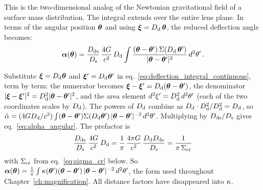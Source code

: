 This is the two-dimensional analog of the Newtonian gravitational field
of a surface mass distribution.  The integral extends over the entire
lens plane.  In terms of the angular position $\boldsymbol{\theta}$ and using
$\boldsymbol{\xi} = D_{\mathrm{d}}\,\boldsymbol{\theta}$, the reduced deflection angle becomes:
\begin{equation}
    \boldsymbol{\alpha}(\boldsymbol{\theta}) = \frac{D_{\mathrm{ds}}}{D_{\mathrm{s}}}\,
    \frac{4G}{c^2}\, D_{\mathrm{d}}
    \int \frac{(\boldsymbol{\theta} - \boldsymbol{\theta}')\, \Sigma(D_{\mathrm{d}}\,\boldsymbol{\theta}')}
    {|\boldsymbol{\theta} - \boldsymbol{\theta}'|^2}\, d^2\theta' \,.
    \label{eq:alpha_angular}
\end{equation}
\begin{derivation}
Substitute $\boldsymbol{\xi} = D_{\mathrm{d}}\boldsymbol{\theta}$ and $\boldsymbol{\xi}' = D_{\mathrm{d}}\boldsymbol{\theta}'$ in
eq.~\eqref{eq:deflection_integral_continuous}, term by term: the
numerator becomes $\boldsymbol{\xi} - \boldsymbol{\xi}' = D_{\mathrm{d}}(\boldsymbol{\theta} - \boldsymbol{\theta}')$, the
denominator $|\boldsymbol{\xi} - \boldsymbol{\xi}'|^2 = D_{\mathrm{d}}^2|\boldsymbol{\theta} - \boldsymbol{\theta}'|^2$, and
the area element $d^2\xi' = D_{\mathrm{d}}^2\, d^2\theta'$ (each of the two
coordinates scales by $D_{\mathrm{d}}$).
The powers of $D_{\mathrm{d}}$ combine as $D_{\mathrm{d}} \cdot D_{\mathrm{d}}^2 / D_{\mathrm{d}}^2 = D_{\mathrm{d}}$, so
$\hat{\alpha} = (4GD_{\mathrm{d}}/c^2)\int(\boldsymbol{\theta} - \boldsymbol{\theta}')
\Sigma(D_{\mathrm{d}}\boldsymbol{\theta}')\,|\boldsymbol{\theta} - \boldsymbol{\theta}'|^{-2}\,d^2\theta'$. Multiplying by
$D_{\mathrm{ds}}/D_{\mathrm{s}}$ gives eq.~\eqref{eq:alpha_angular}. The prefactor is
\begin{equation*}
    \frac{D_{\mathrm{ds}}}{D_{\mathrm{s}}}\,\frac{4G}{c^2}\,D_{\mathrm{d}}
    = \frac{1}{\pi}\,\frac{4\pi G}{c^2}\,\frac{D_{\mathrm{d}}D_{\mathrm{ds}}}{D_{\mathrm{s}}}
    = \frac{1}{\pi\,\Sigma_{\mathrm{cr}}}
\end{equation*}
with $\Sigma_{\mathrm{cr}}$ from eq.~\eqref{eq:sigma_cr} below. So
$\boldsymbol{\alpha}(\boldsymbol{\theta}) = \frac{1}{\pi}\int\kappa(\boldsymbol{\theta}')
(\boldsymbol{\theta} - \boldsymbol{\theta}')\,|\boldsymbol{\theta} - \boldsymbol{\theta}'|^{-2}\,d^2\theta'$, the
form used throughout Chapter~\ref{ch:magnification}. All distance factors have
disappeared into $\kappa$.
\end{derivation}

